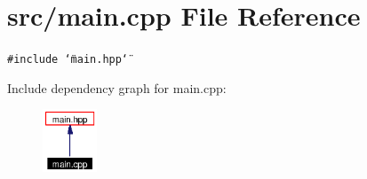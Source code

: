 \section{src/main.cpp File Reference}
\label{main_8cpp}
{\tt \#include \char`\"{}main.hpp\char`\"{}}\par


Include dependency graph for main.cpp:\begin{figure}[H]
\begin{center}
\leavevmode
\includegraphics[width=46pt]{main_8cpp__incl}
\end{center}
\end{figure}
